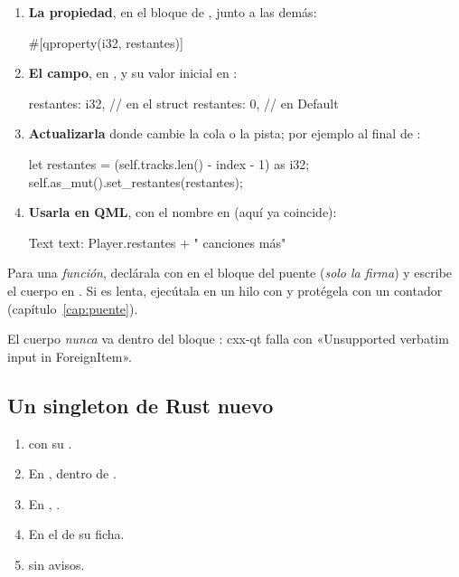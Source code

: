 \begin{enumerate}
  \item \textbf{La propiedad}, en el bloque  de ,
  junto a las demás:
\begin{rust}
#[qproperty(i32, restantes)]
\end{rust}
  \item \textbf{El campo}, en , y su valor inicial en
  :
\begin{rust}
restantes: i32,          // en el struct
restantes: 0,            // en Default
\end{rust}
  \item \textbf{Actualizarla} donde cambie la cola o la pista; por ejemplo al final de
  :
\begin{rust}
let restantes = (self.tracks.len() - index - 1) as i32;
self.as_mut().set_restantes(restantes);
\end{rust}
  \item \textbf{Usarla en QML}, con el nombre en  (aquí ya coincide):
\begin{qml}
Text { text: Player.restantes + " canciones más" }
\end{qml}
\end{enumerate}

Para una \emph{función}, declárala con \cod{#[qinvokable]} en el bloque del puente
(\emph{solo la firma}) y escribe el cuerpo en . Si es lenta, ejecútala
en un hilo con  y protégela con un contador (capítulo~\ref{cap:puente}).

\begin{trampa}
El cuerpo \emph{nunca} va dentro del bloque : cxx-qt falla con
«Unsupported verbatim input in ForeignItem».
\end{trampa}

\subsection{Un singleton de Rust nuevo}

\begin{enumerate}
  \item {} con su .
  \item En , dentro de .
  \item En , .
  \item En el  de su ficha.
  \item {} sin avisos.
\end{enumerate}

